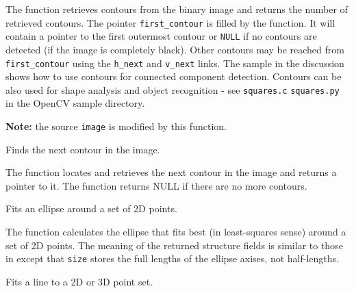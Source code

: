 The function retrieves contours from the
binary image and returns the number of retrieved contours. The
pointer \texttt{first\_contour} is filled by the function. It will
contain a pointer to the first outermost contour or \texttt{NULL} if no
contours are detected (if the image is completely black). Other
contours may be reached from \texttt{first\_contour} using the
\texttt{h\_next} and \texttt{v\_next} links. The sample in the
 discussion shows how to use contours for
connected component detection. Contours can be also used for shape
analysis and object recognition - see
\ifC
\texttt{squares.c}
\else
\texttt{squares.py}
\fi
in the OpenCV sample directory.

\textbf{Note:} the source \texttt{image} is modified by this function.

\ifC %

Finds the next contour in the image.


\begin{description}
\end{description}

The function locates and retrieves the next contour in the image and returns a pointer to it. The function returns NULL if there are no more contours.

\fi %

Fits an ellipse around a set of 2D points.


\begin{description}
\end{description}

The function calculates the ellipse that fits best
(in least-squares sense) around a set of 2D points. The meaning of the
returned structure fields is similar to those in  except
that \texttt{size} stores the full lengths of the ellipse axises,
not half-lengths.

Fits a line to a 2D or 3D point set.



